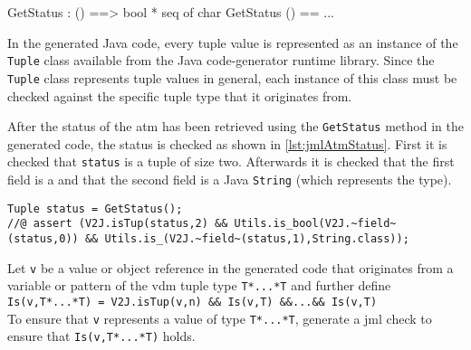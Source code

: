 \begin{vdmsl}[style=customVdm,caption={The signature of the
\texttt{GetStatus} operation.},label={lst:vdmTuple}]
GetStatus : () ==> bool * seq of char
GetStatus () == ...
\end{vdmsl}



In the generated Java code, every tuple value is represented as an
instance of the \texttt{Tuple} class available from the Java code-generator
runtime library. Since the \texttt{Tuple} class represents
tuple values in general, each instance of this class must be checked
against the specific tuple type that it originates from.

After the status of the \ac{atm} has been retrieved using the
\texttt{GetStatus} method in the generated code, the status is checked
as shown in \autoref{lst:jmlAtmStatus}. First it is checked that
\texttt{status} is a tuple of size two. Afterwards it is checked that
the first field is a  and that the second field is a Java
\texttt{String} (which represents the \texttt{} type).

\begin{lstlisting}[style=customJml,caption={Checking the \ac{atm}
status in the generated code.},label={lst:jmlAtmStatus}]
Tuple status = GetStatus();
//@ assert (V2J.isTup(status,2) && Utils.is_bool(V2J.~field~(status,0)) && Utils.is_(V2J.~field~(status,1),String.class));
\end{lstlisting}

 {Let \texttt{v} be a value or
  object reference in the generated code that originates from a
  variable or pattern of the \ac{vdm} tuple type
  \texttt{T*...*T} and further define\\
  \texttt{Is(v,T*...*T) = V2J.isTup(v,n) \&\&
    Is(v,T) \&\&...\&\& Is(v,T)}\\ To ensure that
  \texttt{v} represents a value of type \texttt{T*...*T},
  generate a \ac{jml} check to ensure that
  \texttt{Is(v,T*...*T)} holds.}

